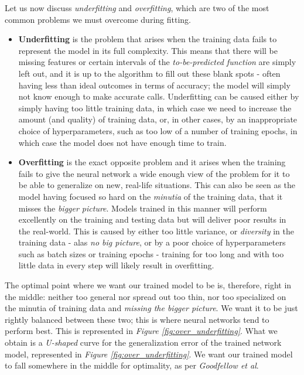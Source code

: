 Let us now discuss \textit{underfitting} and \textit{overfitting}, which are two of the most common problems we must overcome during fitting.
\begin{itemize}
    \item \textbf{Underfitting} is the problem that arises when the training data fails to represent the model in its full complexity. This means that there will be missing features or certain intervals of the \textit{to-be-predicted function} are simply left out, and it is up to the algorithm to fill out these blank spots - often having less than ideal outcomes in terms of accuracy; the model will simply not know enough to make accurate calls. Underfitting can be caused either by simply having too little training data, in which case we need to increase the amount (and quality) of training data, or, in other cases, by an inappropriate choice of hyperparameters, such as too low of a number of training epochs, in which case the model does not have enough time to train.
    \item \textbf{Overfitting} is the exact opposite problem and it arises when the training fails to give the neural network a wide enough view of the problem for it to be able to generalize on new, real-life situations. This can also be seen as the model having focused so hard on the \textit{minutia} of the training data, that it misses the \textit{bigger picture}. Models trained in this manner will perform excellently on the training and testing data but will deliver poor results in the real-world. This is caused by either too little variance, or \textit{diversity} in the training data - alas \textit{no big picture}, or by a poor choice of hyperparameters such as batch sizes or training epochs - training for too long and with too little data in every step will likely result in overfitting.
\end{itemize}

The optimal point where we want our trained model to be is, therefore, right in the middle: neither too general nor spread out too thin, nor too specialized on the minutia of training data and \textit{missing the bigger picture}. We want it to be just rightly balanced between these two; this is where neural networks tend to perform best. This is represented in \textit{Figure \ref{fig:over_underfitting}}. What we obtain is a \textit{U-shaped} curve for the generalization error of the trained network model, represented in \textit{Figure \ref{fig:over_underfitting}}. We want our trained model to fall somewhere in the middle for optimality, as per \textit{Goodfellow et al}. \cite{Goodfellow-et-al-2016}

